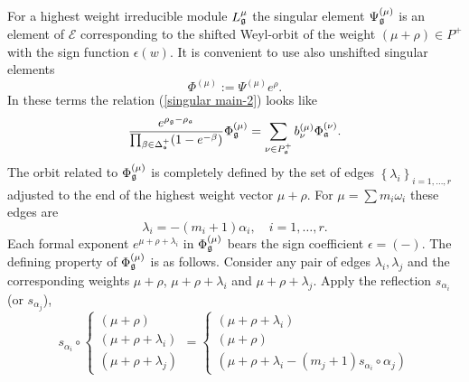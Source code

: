 \documentclass[12pt]{article}
\begin{document}
For a highest weight irreducible module $L_{\frak{g}}^{\mu }$ the singular
element $\Psi _{\frak{g}}^{\left( \mu \right) }$ is an element of $\mathcal{E%
}$ corresponding to the shifted Weyl-orbit of the weight $\left( \mu +\rho
\right) \in P^{+}$ with the sign function $\epsilon \left( w\right) $. It is
convenient to use also unshifted singular elements
\begin{equation}
\Phi ^{\left( \mu \right) }:=\Psi ^{\left( \mu \right) }e^{\rho }.
\label{definition Phi}
\end{equation}
In these terms the relation (\ref{singular main-2}) looks like
\begin{equation}
\frac{e^{\rho _{\frak{g}}-\rho _{\frak{a}}}}{\prod_{\beta \in \Delta _{\frak{%
s}}^{+}}(1-e^{-\beta })}\Phi _{\frak{g}}^{\left( \mu \right) }=\sum_{\nu \in
P_{\frak{a}}^{+}}b_{\nu }^{(\mu )}\Phi _{\frak{a}}^{\left( \nu \right) }.
\label{singular main-3}
\end{equation}
The orbit related to $\Phi _{\frak{g}}^{\left( \mu \right) }$ is completely
defined by the set of edges $\left\{ \lambda _{i}\right\} _{i=1,\dots ,r}$
adjusted to the end of the highest weight vector $\mu +\rho $. For $\mu
=\sum m_{i}\omega _{i}$ these edges are
\begin{equation}
\lambda _{i}=-\left( m_{i}+1\right) \alpha _{i},\quad i=1,\dots ,r.
\label{edge}
\end{equation}
Each formal exponent $e^{\mu +\rho +\lambda _{i}}$ in $\Phi _{\frak{g}%
}^{\left( \mu \right) }$ bears the sign coefficient $\epsilon =(-)$. The
defining property of $\Phi _{\frak{g}}^{\left( \mu \right) }$ is as follows.
Consider any pair of edges $\lambda _{i},\lambda _{j}$ and the corresponding
weights $\mu +\rho $, $\mu +\rho +\lambda _{i}$ and $\mu +\rho +\lambda _{j}$. 
Apply the reflection $s_{\alpha _{i}}$ (or $s_{\alpha _{j}}$),
\begin{equation}
s_{\alpha _{i}}\circ \left\{
\begin{array}{l}
\left( \mu +\rho \right)  \\
\left( \mu +\rho +\lambda _{i}\right)  \\
\left( \mu +\rho +\lambda _{j}\right)
\end{array}
\right. =\left\{
\begin{array}{l}
\left( \mu +\rho +\lambda _{i}\right)  \\
\left( \mu +\rho \right)  \\
\left( \mu +\rho +\lambda _{i}-(m_{j}+1)s_{\alpha _{i}}\circ \alpha
_{j}\right)
\end{array}
\right.   \label{reflected triple}
\end{equation}
\end{document}
